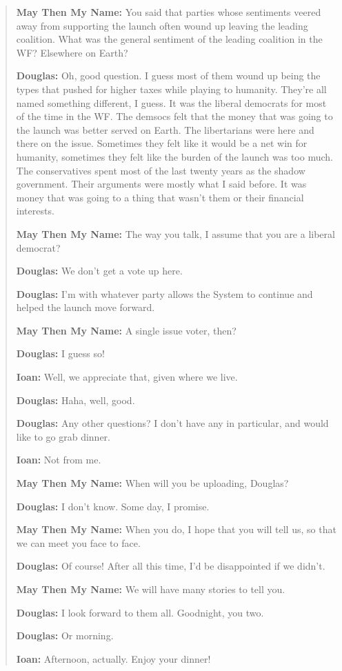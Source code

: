 \begin{quote}
\textbf{May Then My Name:} You said that parties whose sentiments veered away from supporting the launch often wound up leaving the leading coalition. What was the general sentiment of the leading coalition in the WF? Elsewhere on Earth?

\textbf{Douglas:} Oh, good question. I guess most of them wound up being the types that pushed for higher taxes while playing to humanity. They're all named something different, I guess. It was the liberal democrats for most of the time in the WF. The demsocs felt that the money that was going to the launch was better served on Earth. The libertarians were here and there on the issue. Sometimes they felt like it would be a net win for humanity, sometimes they felt like the burden of the launch was too much. The conservatives spent most of the last twenty years as the shadow government. Their arguments were mostly what I said before. It was money that was going to a thing that wasn't them or their financial interests.

\textbf{May Then My Name:} The way you talk, I assume that you are a liberal democrat?

\textbf{Douglas:} We don't get a vote up here.

\textbf{Douglas:} I'm with whatever party allows the System to continue and helped the launch move forward.

\textbf{May Then My Name:} A single issue voter, then?

\textbf{Douglas:} I guess so!

\textbf{Ioan:} Well, we appreciate that, given where we live.

\textbf{Douglas:} Haha, well, good.

\textbf{Douglas:} Any other questions? I don't have any in particular, and would like to go grab dinner.

\textbf{Ioan:} Not from me.

\textbf{May Then My Name:} When will you be uploading, Douglas?

\textbf{Douglas:} I don't know. Some day, I promise.

\textbf{May Then My Name:} When you do, I hope that you will tell us, so that we can meet you face to face.

\textbf{Douglas:} Of course! After all this time, I'd be disappointed if we didn't.

\textbf{May Then My Name:} We will have many stories to tell you.

\textbf{Douglas:} I look forward to them all. Goodnight, you two.

\textbf{Douglas:} Or morning.

\textbf{Ioan:} Afternoon, actually. Enjoy your dinner!
\end{quote}
